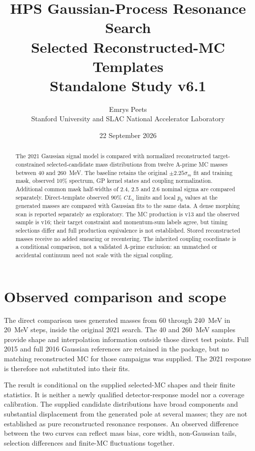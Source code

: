 \documentclass[11pt]{article}
\title{HPS Gaussian-Process Resonance Search\\[.5em]
\large Selected Reconstructed-MC Templates\\Standalone Study v6.1}
\author{Emrys Peets\\Stanford University and SLAC National Accelerator Laboratory}
\date{22 September 2026}
\begin{document}
\maketitle
\begin{abstract}
The 2021 Gaussian signal model is compared with normalized reconstructed
target-constrained selected-candidate mass distributions from twelve A-prime MC
masses between 40 and 260~MeV. The baseline retains the original $\pm2.25\sigma_m$ fit and
training mask, observed 10\% spectrum, GP kernel states and coupling
normalization. Additional common mask half-widths of 2.4, 2.5 and 2.6
nominal sigma are compared separately. Direct-template observed 90\% $CL_s$ limits
and local $p_0$ values at the generated masses are compared with Gaussian
fits to the same data. A dense morphing scan is reported separately as
exploratory. The MC production is v13 and the observed sample is v16;
their target constraint and momentum-sum labels agree, but timing
selections differ and full production equivalence is not established.
Stored reconstructed masses receive no added smearing or recentering.
The inherited coupling coordinate is a conditional comparison, not a
validated A-prime exclusion: an unmatched or accidental continuum need
not scale with the signal coupling.
\end{abstract}

\section{Observed comparison and scope}


The direct comparison uses generated masses from 60 through 240~MeV in
20~MeV steps, inside the original 2021 search. The 40 and 260~MeV samples
provide shape and interpolation information outside those direct test
points. Full 2015 and full 2016 Gaussian references are retained in the
package, but no matching reconstructed MC for those campaigns was
supplied. The 2021 response is therefore not substituted into their fits.

The result is conditional on the supplied selected-MC shapes and their
finite statistics. It is neither a newly qualified detector-response
model nor a coverage calibration. The supplied candidate distributions
have broad components and substantial displacement from the generated
pole at several masses; they are not established as pure reconstructed
resonance responses. An observed difference between the two
curves can reflect mass bias, core width, non-Gaussian tails, selection
differences and finite-MC fluctuations together.
\end{document}
